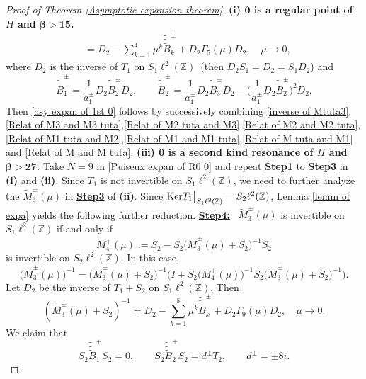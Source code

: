 \documentclass[reqno, 11pt]{amsart}
\newcommand\Z{\mathbb{Z}}
\numberwithin{equation}{section}
\begin{document}
\begin{proof}[Proof of Theorem {\rm\ref{Asymptotic expansion theorem}}]{\bf{(i) ${\bm{0}}$ is a regular point of $H$ and {$\bm{\beta>15}$}.}}
\begin{align}
&=D_2-\sum\limits_{k=1}^{4}\mu^k\tilde{\tilde{\tilde{B}}}^{\pm}_{k}+D_2\Gamma_5(\mu)D_2,\quad \mu\rightarrow0,
\end{align}
where $D_2$ is the inverse of $T_1$ on $S_1\ell^2(\Z)$~(then $D_2S_1=D_2=S_1D_2$) and
\begin{equation}\label{expre of Btttpm tuta} \tilde{\tilde{\tilde{B}}}^{\pm}_{1}=\frac{1}{a^{\pm}_{1}}D_2\tilde{\tilde{B}}^{\pm}_2D_2,\qquad\tilde{\tilde{\tilde{B}}}^{\pm}_{2}=\frac{1}{a^{\pm}_{1}}D_2\tilde{\tilde{B}}^{\pm}_3D_2-\Big(\frac{1}{a^{\pm}_{1}}D_2\tilde{\tilde{B}}^{\pm}_2\Big)^2D_2.
\end{equation}
Then \eqref{asy expan of 1st 0} follows by successively combining \eqref{inverse of Mtuta3},\eqref{Relat of M3 and M3 tuta},\eqref{Relat of M2 tuta and M3},\eqref{Relat of M2 and M2 tuta},\eqref{Relat of M1 tuta and M2},\eqref{Relat of M1 and M1 tuta},\eqref{Relat of M tuta and M1} and \eqref{Relat of M and M tuta}.
\vskip0.2cm
{\bf{(iii) ${\bm{0}}$ is a second kind resonance of $H$ and {$\bm{\beta>27}$}.}} Take $N=9$ in \eqref{Puiseux expan of R0 0} and repeat {\bf{\underline{Step1}}} to {\bf{\underline{Step3}}} in {\bf{(i)}} and {\bf{(ii)}}. Since $T_1$ is not invertible on $S_1\ell^2(\Z)$, we need to further analyze the $\widetilde{M}^{\pm}_3(\mu)$ in {\bf{\underline{Step3}}} of {\bf{(ii)}}. Since ${\rm Ker}T_1\big|_{S_1\ell^2(\Z)}=S_2\ell^2(\Z)$, Lemma \ref{lemm of expa} yields the following further reduction.
\vskip0.15cm
{\bf{\underline{Step4:}}} \ $\widetilde{M}_{3}^{\pm}(\mu)$ is invertible on $S_1\ell^{2}(\Z)$ if and only if $$ M^{\pm}_{4}(\mu):=S_2-S_2\big(\widetilde{M}_{3}^{\pm}(\mu)+S_2\big)^{-1}S_2$$ is invertible on $S_2\ell^{2}(\Z)$. In this case,
\begin{equation}\label{Relat of M3 tuta and M4}
\big(\widetilde{M}_{3}^{\pm}(\mu)\big)^{-1}=\big(\widetilde{M}_{3}^{\pm}(\mu)+S_2\big)^{-1}\Big(I+S_2\big(M^{\pm}_{4}(\mu)\big)^{-1}S_2\big(\widetilde{M}_{3}^{\pm}(\mu)+S_2\big)^{-1}\Big).
\end{equation}
Let $D_2$ be the inverse of $T_1+S_2$ on $S_1\ell^2(\Z)$.
Then 
\begin{equation*}
\left(\widetilde{M}_{3}^{\pm}(\mu)+S_2\right)^{-1}=D_2-\sum\limits_{k=1}^{8}\mu^k\tilde{\tilde{\tilde{B}}}^{\pm}_{k}+D_2\Gamma_9(\mu)D_2, \quad \mu\rightarrow0.
\end{equation*}
We claim that  \begin{equation}\label{S2Bttt1S2,S2Bttt2S2}
S_2\tilde{\tilde{\tilde{B}}}^{\pm}_{1}S_2=0, \qquad S_2\tilde{\tilde{\tilde{B}}}^{\pm}_{2}S_2=d^{\pm}T_2,\qquad d^{\pm}=\pm8i.

\end{equation}
\end{proof}
\end{document}
